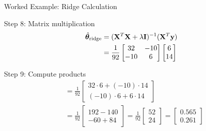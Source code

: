 \documentclass{beamer}
\begin{document}
\begin{frame}{Worked Example: Ridge Calculation}
\begin{codebox}{Step 8: Matrix multiplication}
\begin{align*}
\hat{\boldsymbol{\theta}}_{\text{ridge}} &= (\mathbf{X}^{T}\mathbf{X} + \lambda\mathbf{I})^{-1}(\mathbf{X}^{T}\mathbf{y}) \\
&= \frac{1}{92} \begin{bmatrix} 32 & -10 \\ -10 & 6 \end{bmatrix} \begin{bmatrix} 6 \\ 14 \end{bmatrix}
\end{align*}
\end{codebox}
\pause

\begin{codebox}{Step 9: Compute products}
\begin{align*}
&= \frac{1}{92} \begin{bmatrix} 32 \cdot 6 + (-10) \cdot 14 \\ (-10) \cdot 6 + 6 \cdot 14 \end{bmatrix} \\
&= \frac{1}{92} \begin{bmatrix} 192-140 \\ -60+84 \end{bmatrix} = \frac{1}{92} \begin{bmatrix} 52 \\ 24 \end{bmatrix} = \begin{bmatrix} 0.565 \\ 0.261 \end{bmatrix}
\end{align*}
\end{codebox}
\end{frame}
\end{document}
